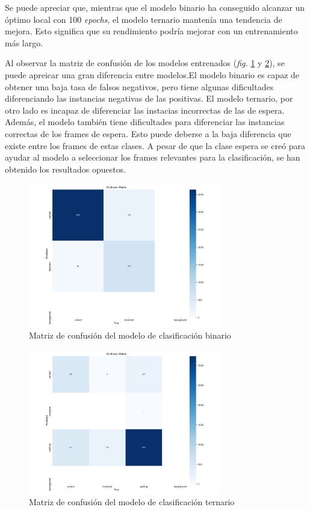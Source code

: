 \documentclass[12pt]{report} %
\begin{document}
    Se puede apreciar que, mientras que el modelo binario ha conseguido
    alcanzar un óptimo local con 100 \textit{epochs}, el modelo ternario
    mantenía una tendencia de mejora. Esto significa que su rendimiento podría
    mejorar con un entrenamiento más largo.

    Al observar la matriz de confusión de los modelos entrenados (\textit{fig.}
    \ref{mc1} y \ref{mc2}), se puede apreicar una gran diferencia entre
    modelos.El modelo binario es capaz de obtener una baja tasa de falsos
    negativos, pero tiene algunas dificultades diferenciando las instancias
    negativas de las positivas. El modelo ternario, por otro lado es incapaz
    de diferenciar las instacias incorrectas de las de espera.  Además, el
    modelo también tiene dificultades para diferenciar las instancias correctas
    de los frames de espera. Esto puede deberse a la baja diferencia que existe
    entre los frames de estas clases. A pesar de que la clase espera se creó
    para ayudar al modelo a seleccionar los frames relevantes para la
    clasificación, se han obtenido los resultados opuestos.

    \begin{figure}[H]
    \includegraphics[width=0.75\textwidth]{confusion_matrix2.png}
    \caption  {Matriz de confusión del modelo de clasificación binario}
    \label{mc1}
    \end{figure}
    \begin{figure}[H]
    \includegraphics[width=0.75\textwidth]{confusion_matrix3.png}
    \caption  {Matriz de confusión del modelo de clasificación ternario}
    \label{mc2}
    \end{figure}
\end{document}
